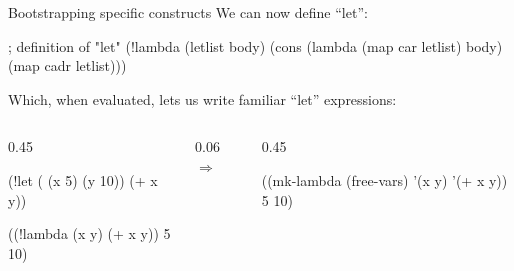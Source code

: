 \begin{frame}[fragile]{Bootstrapping specific constructs}
We can now define ``let'':
\begin{listingbox}\begin{ildcode}
; definition of "let"
(!lambda (letlist body)
  (cons
    (lambda
      (map car letlist)
      body)
    (map cadr letlist)))
\end{ildcode}\end{listingbox}

Which, when evaluated, lets us write familiar ``let'' expressions:
\begin{columns}[c,onlytextwidth]
\begin{column}{0.45\textwidth}
\begin{listingbox}\begin{ildcode}
(!let (
    (x 5)
    (y 10))
  (+ x y))
\end{ildcode}\end{listingbox}
\vspace{2pt}
\par\noindent\hfill{}\hfill\null\par
\begin{listingbox}\begin{ildcode}
((!lambda (x y)
    (+ x y))
  5 10)
\end{ildcode}\end{listingbox}
\end{column}
\begin{column}{0.06\textwidth}
\centering
$\Rightarrow$
\end{column}
\begin{column}{0.45\textwidth}
\begin{listingbox}\begin{ildcode}
((mk-lambda
    (free-vars)
    '(x y)
    '(+ x y))
  5 10)
\end{ildcode}\end{listingbox}
\end{column}
\end{columns}
\end{frame}

